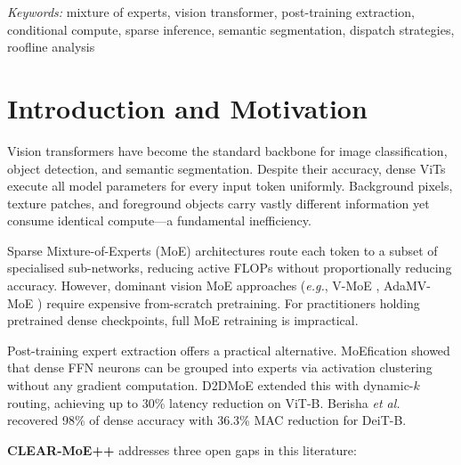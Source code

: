 \documentclass[12pt,a4paper]{article}
\newcommand{\clearmoep}{\textbf{CLEAR-MoE++}}
\newcommand{\eg}{\emph{e.g.}}
\newcommand{\etal}{\emph{et al.}}
\begin{document}
\begin{titlepage}
\vfill
{\small\textit{Keywords:} mixture of experts, vision transformer, post-training extraction, conditional compute, sparse inference, semantic segmentation, dispatch strategies, roofline analysis}
\end{titlepage}

\tableofcontents
\newpage


\section{Introduction and Motivation}
\label{sec:intro}

Vision transformers \cite{dosovitskiy2021vit, liu2021swin} have become the standard backbone for image classification, object detection, and semantic segmentation. Despite their accuracy, dense ViTs execute all model parameters for every input token uniformly. Background pixels, texture patches, and foreground objects carry vastly different information yet consume identical compute—a fundamental inefficiency.

Sparse Mixture-of-Experts (MoE) architectures \cite{shazeer2017outrageously} route each token to a subset of specialised sub-networks, reducing active FLOPs without proportionally reducing accuracy. However, dominant vision MoE approaches (\eg, V-MoE \cite{riquelme2021vmoe}, AdaMV-MoE \cite{chen2023adamvmoe}) require expensive from-scratch pretraining. For practitioners holding pretrained dense checkpoints, full MoE retraining is impractical.

Post-training expert extraction offers a practical alternative. MoEfication \cite{zhang2022moefication} showed that dense FFN neurons can be grouped into experts via activation clustering without any gradient computation. D2DMoE \cite{d2dmoe2024} extended this with dynamic-$k$ routing, achieving up to 30\% latency reduction on ViT-B. Berisha \etal\ \cite{berisha2025cvpr} recovered 98\% of dense accuracy with 36.3\% MAC reduction for DeiT-B.

\clearmoep{} addresses three open gaps in this literature:
\end{document}
